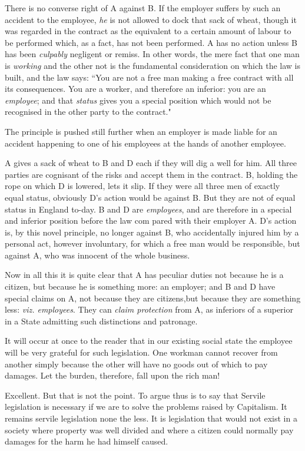 \documentclass{book}
\begin{document}
There is no converse right of A against B. If the employer suffers by such an accident to the employee, \emph{he} is not allowed to dock that sack of wheat, though it was regarded in the contract as the equivalent to a certain amount of labour to be performed which, as a fact, has not been performed. A has no action unless B has been \emph{culpably} negligent or remiss. In other words, the mere fact that one man is \emph{working} and the other not is the fundamental consideration on which the law is built, and the law says: “You are not a free man making a free contract with all its consequences. You are a worker, and therefore an inferior: you are an \emph{employee}; and that \emph{status} gives you a special position which would not be recognised in the other party to the contract."

The principle is pushed still further when an employer is made liable for an accident happening to one of his employees at the hands of another employee.

A gives a sack of wheat to B and D each if they will dig a well for him. All three parties are cognisant of the risks and accept them in the contract. B, holding the rope on which D is lowered, lets it slip. If they were all three men of exactly equal status, obviously D’s action would be against B. But they are not of equal status in England to-day. B and D are \emph{employees}, and are therefore in a special and inferior position before the law com pared with their employer A. D’s action is, by this novel principle, no longer against B, who accidentally injured him by a personal act, however involuntary, for which a free man would be responsible, but against A, who was innocent of the whole business.

Now in all this it is quite clear that A has peculiar duties not because he is a citizen, but because he is something more: an employer; and B and D have special claims on A, not because they are citizens,but because they are something less: \emph{viz. employees}. They can \emph{claim protection} from A, as inferiors of a superior in a State admitting such distinctions and patronage.

It will occur at once to the reader that in our existing social state the employee will be very grateful for such legislation. One workman cannot recover from another simply because the other will have no goods out of which to pay damages. Let the burden, therefore, fall upon the rich man!

Excellent. But that is not the point. To argue thus is to say that Servile legislation is necessary if we are to solve the problems raised by Capitalism. It remains servile legislation none the less. It is legislation that would not exist in a society where property was well divided and where a citizen could normally pay damages for the harm he had himself caused.\footnotemark[1]
\end{document}
